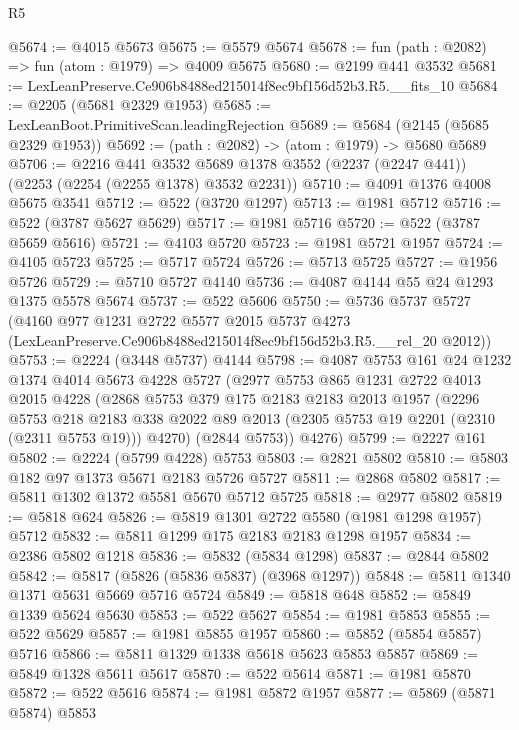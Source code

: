 \begin{lexlean}{R5}
\begin{coremodule}
@5674 := @4015 @5673
@5675 := @5579 @5674
@5678 := fun (path : @2082) => fun (atom : @1979) => @4009 @5675
@5680 := @2199 @441 @3532
@5681 := LexLeanPreserve.Ce906b8488ed215014f8ec9bf156d52b3.R5.__fits_10
@5684 := @2205 (@5681 @2329 @1953)
@5685 := LexLeanBoot.PrimitiveScan.leadingRejection
@5689 := @5684 (@2145 (@5685 @2329 @1953))
@5692 := (path : @2082) -> (atom : @1979) -> @5680 @5689
@5706 := @2216
    @441
    @3532
    @5689
    @1378
    @3552
    (@2237 (@2247 @441))
    (@2253 (@2254 (@2255 @1378) @3532 @2231))
@5710 := @4091 @1376 @4008 @5675 @3541
@5712 := @522 (@3720 @1297)
@5713 := @1981 @5712
@5716 := @522 (@3787 @5627 @5629)
@5717 := @1981 @5716
@5720 := @522 (@3787 @5659 @5616)
@5721 := @4103 @5720
@5723 := @1981 @5721 @1957
@5724 := @4105 @5723
@5725 := @5717 @5724
@5726 := @5713 @5725
@5727 := @1956 @5726
@5729 := @5710 @5727 @4140
@5736 := @4087 @4144 @55 @24 @1293 @1375 @5578 @5674
@5737 := @522 @5606
@5750 := @5736
    @5737
    @5727
    (@4160
      @977
      @1231
      @2722
      @5577
      @2015
      @5737
      @4273
      (LexLeanPreserve.Ce906b8488ed215014f8ec9bf156d52b3.R5.__rel_20 @2012))
@5753 := @2224 (@3448 @5737) @4144
@5798 := @4087
    @5753
    @161
    @24
    @1232
    @1374
    @4014
    @5673
    @4228
    @5727
    (@2977
      @5753
      @865
      @1231
      @2722
      @4013
      @2015
      @4228
      (@2868
        @5753
        @379
        @175
        @2183
        @2183
        @2013
        @1957
        (@2296
          @5753
          @218
          @2183
          @338
          @2022
          @89
          @2013
          (@2305 @5753 @19 @2201 (@2310 (@2311 @5753 @19)))
          @4270)
        (@2844 @5753))
      @4276)
@5799 := @2227 @161
@5802 := @2224 (@5799 @4228) @5753
@5803 := @2821 @5802
@5810 := @5803 @182 @97 @1373 @5671 @2183 @5726 @5727
@5811 := @2868 @5802
@5817 := @5811 @1302 @1372 @5581 @5670 @5712 @5725
@5818 := @2977 @5802
@5819 := @5818 @624
@5826 := @5819 @1301 @2722 @5580 (@1981 @1298 @1957) @5712
@5832 := @5811 @1299 @175 @2183 @2183 @1298 @1957
@5834 := @2386 @5802 @1218
@5836 := @5832 (@5834 @1298)
@5837 := @2844 @5802
@5842 := @5817 (@5826 (@5836 @5837) (@3968 @1297))
@5848 := @5811 @1340 @1371 @5631 @5669 @5716 @5724
@5849 := @5818 @648
@5852 := @5849 @1339 @5624 @5630
@5853 := @522 @5627
@5854 := @1981 @5853
@5855 := @522 @5629
@5857 := @1981 @5855 @1957
@5860 := @5852 (@5854 @5857) @5716
@5866 := @5811 @1329 @1338 @5618 @5623 @5853 @5857
@5869 := @5849 @1328 @5611 @5617
@5870 := @522 @5614
@5871 := @1981 @5870
@5872 := @522 @5616
@5874 := @1981 @5872 @1957
@5877 := @5869 (@5871 @5874) @5853

\end{coremodule}
\end{lexlean}
